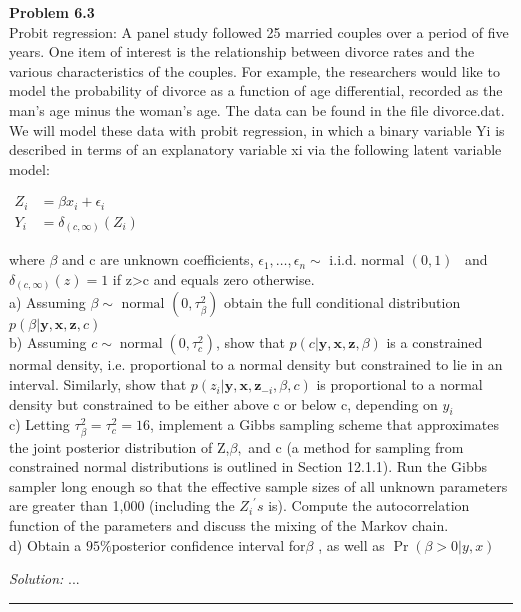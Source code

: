 \documentclass[a4paper, 11pt]{article}
\newenvironment{problem}[2][Problem]
    { \begin{mdframed}[backgroundcolor=gray!20] \textbf{#1 #2} \\}
    {  \end{mdframed}}
\newenvironment{solution}
    {\textit{Solution:}}
    {}
\begin{document}
\begin{problem}{6.3}
  Probit regression: A panel study followed 25 married couples over a period of five years. One item of interest is the relationship between divorce rates and the various characteristics of the couples. For example, the researchers would like to model the probability of divorce as a function of age differential, recorded as the man’s age minus the woman’s age. The data can be found in the file divorce.dat. We will model these data with probit regression, in which a binary variable Yi is described in terms of an explanatory variable xi via the following latent variable model:
  \begin{center}
      $\begin{aligned} Z_{i} &=\beta x_{i}+\epsilon_{i} \\ Y_{i} &=\delta_{(c, \infty)}\left(Z_{i}\right) \end{aligned}$
  \end{center}
   where $ \beta$  and c are unknown coefficients, $ \epsilon_{1}, \ldots, \epsilon_{n} \sim \text { i.i.d. normal }(0,1)$ \ and $ \delta_{(c, \infty)}(z)=1 $ if  z>c  and equals zero otherwise. \\

  a) Assuming $ \beta \sim \text { normal }\left(0, \tau_{\beta}^{2}\right) $ obtain the full conditional distribution $  p(\beta | \boldsymbol{y}, \boldsymbol{x}, \boldsymbol{z}, c) $\\
   b) Assuming $ c \sim \operatorname{normal}\left(0, \tau_{c}^{2}\right)$,  show that $ p(c | \boldsymbol{y}, \boldsymbol{x}, \boldsymbol{z}, \beta)$  is a constrained  normal density, i.e. proportional to a normal density but constrained to lie in an interval. Similarly, show that $p\left(z_{i} | \boldsymbol{y}, \boldsymbol{x}, \boldsymbol{z}_{-i}, \beta, c\right)$  is proportional to a normal density but constrained to be either above  c  or  below  c,  depending on $ y_{i}$\\
   c) Letting $ \tau_{\beta}^{2}=\tau_{c}^{2}=16 $, implement a Gibbs sampling scheme that approximates the joint posterior distribution of  Z,$ \beta,$  and  c  (a method for sampling from constrained normal distributions is outlined in Section 12.1.1). Run the Gibbs sampler long enough so that the effective  sample sizes of all unknown parameters are greater than 1,000 (including the $ {Z_i}^{'}s$  is). Compute the autocorrelation function of the parameters  and discuss the mixing of the Markov chain. \\
  d) Obtain a $95 \%$posterior confidence interval for$\beta $ , as well as $\operatorname{Pr}(\beta> 0 | y, x)$


\end{problem}
\begin{solution}
...

\end{solution}

\noindent\rule{7in}{2.8pt}
\end{document}
